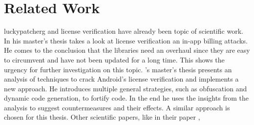 \section{Related Work} \label{subsection:introduction-related}
\gls{luckypatcherg} and license verification have already been topic of scientific work.
\newline
In his master's thesis  \cite{bernhardSecurity} \citeauthor{bernhardSecurity} takes a look at license verification an in-app billing attacks.
He comes to the conclusion that the libraries need an overhaul since they are easy to circumvent and have not been updated for a long time.
This shows the urgency for further investigation on this topic.
\newline
\citeauthor{munteanLicense}'s master's thesis  \cite{munteanLicense} presents an analysis of techniques to crack Android's license verification and implements a new approach.
He introduces multiple general strategies, such as obfuscation and dynamic code generation, to fortify code.
In the end he uses the insights from the analysis to suggest countermeasures and their effects.
A similar approach is chosen for this thesis.
\newline
Other scientific papers, like \citeauthor{Jang:2013:PAA:2480362.2480673} in their paper ,
